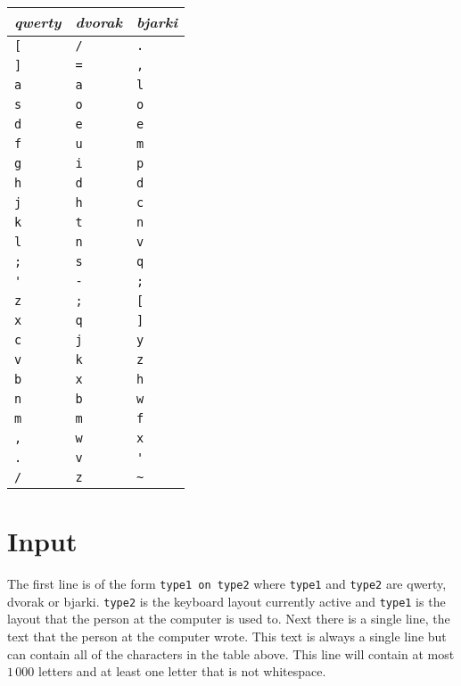 \begin{minipage}{0.45\textwidth}
\begin{tabular}{|l|l|l|} \hline
\emph{qwerty} & \emph{dvorak} & \emph{bjarki} \\ \hline
\verb![! & \verb!/! & \verb!.! \\
\verb!]! & \verb!=! & \verb!,! \\
\verb!a! & \verb!a! & \verb!l! \\
\verb!s! & \verb!o! & \verb!o! \\
\verb!d! & \verb!e! & \verb!e! \\
\verb!f! & \verb!u! & \verb!m! \\
\verb!g! & \verb!i! & \verb!p! \\
\verb!h! & \verb!d! & \verb!d! \\
\verb!j! & \verb!h! & \verb!c! \\
\verb!k! & \verb!t! & \verb!n! \\
\verb!l! & \verb!n! & \verb!v! \\
\verb!;! & \verb!s! & \verb!q! \\
\verb!'! & \verb!-! & \verb!;! \\
\verb!z! & \verb!;! & \verb![! \\
\verb!x! & \verb!q! & \verb!]! \\
\verb!c! & \verb!j! & \verb!y! \\
\verb!v! & \verb!k! & \verb!z! \\
\verb!b! & \verb!x! & \verb!h! \\
\verb!n! & \verb!b! & \verb!w! \\
\verb!m! & \verb!m! & \verb!f! \\
\verb!,! & \verb!w! & \verb!x! \\
\verb!.! & \verb!v! & \verb!'! \\
\verb!/! & \verb!z! & \verb!~! \\ \hline
\end{tabular}
\end{minipage}

\section*{Input}
The first line is of the form \texttt{type1 on type2} where \texttt{type1} and \texttt{type2} are qwerty,
dvorak or bjarki. \texttt{type2} is the keyboard layout currently active and \texttt{type1} is the layout
that the person at the computer is used to. Next there is a single line, the text that the person at the
computer wrote. This text is always a single line but can contain all of the characters in the table above.
This line will contain at most $1\,000$ letters and at least one letter that is not whitespace.

